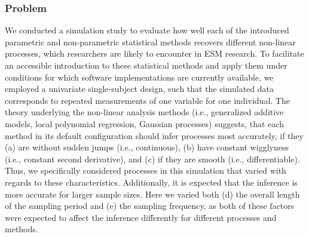 
\subsubsection{Problem}

We conducted a simulation study to evaluate how well each of the introduced
parametric and non-parametric statistical methods recovers different
non-linear processes, which researchers are likely to encounter in ESM
research. To facilitate an accessible introduction to these statistical methods
and apply them under conditions for which software implementations are
currently available, we employed a univariate single-subject design, such that
the simulated data corresponds to repeated measurements of one variable for one
individual. The theory underlying the non-linear analysis methods
(i.e., generalized additive models, local polynomial regression,
Gaussian processes) suggests, that each method in its default configuration
should infer processes most accurately, if they
(a) are without sudden jumps (i.e., continuous),
(b) have constant wigglyness (i.e., constant second derivative), and
(c) if they are smooth (i.e., differentiable).
Thus, we specifically considered processes in this simulation that varied with
regards to these characteristics. Additionally, it is expected that
the inference is more accurate for larger sample sizes. Here we varied both
(d) the overall length of the sampling period and
(e) the sampling frequency, as both of these factors were expected to affect
the
inference differently for different processes and methods.

